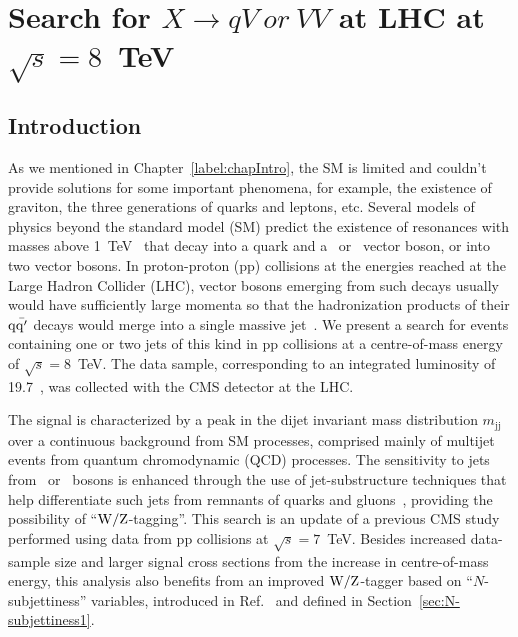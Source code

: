 \chapter{Search for $X \to qV~or~VV$ at LHC at $\sqrt{s}=8$~TeV}
\label{chap:chapter3}
\section{Introduction}
\label{sec:introduction}

As we mentioned in Chapter~\ref{label:chapIntro}, the SM is limited and couldn't
provide solutions for some important phenomena, for example, the existence of 
graviton, the three generations of quarks and leptons, etc. 
Several models of physics beyond the standard model (SM) predict the
existence of resonances with masses above 1~TeV~ that decay into a
quark and a \PW\ or \cPZ\ vector boson, or into two vector bosons. In
proton-proton (pp) collisions at the energies reached at the Large Hadron
Collider (LHC), vector bosons emerging from such decays usually would have
sufficiently large momenta so that the hadronization products of their
${\rm q\bar{q'}}$ decays would merge into a single massive
jet~\cite{Gouzevitch:2013qca}. We present a search for events
containing one or two jets of this kind in pp collisions at a
centre-of-mass energy of $\sqrt{s}=8$~TeV.  The data sample,
corresponding to an integrated luminosity of 19.7~\fbinv, was collected
with the CMS detector at the LHC.

The signal is characterized by a peak in the dijet invariant mass
distribution $m_\mathrm{jj}$ over a continuous background from SM
processes, comprised mainly of multijet events from quantum
chromodynamic (QCD) processes. The sensitivity to jets from \PW\ or
\cPZ\ bosons is enhanced through the use of jet-substructure
techniques that help differentiate such jets from remnants of quarks
and gluons~\cite{topwtag_pas,JME-13-006}, providing the possibility of
``${\rm W}/{\rm Z}$-tagging''. This search is an update of a previous CMS
study~\cite{ref_2011} performed using data from pp collisions at
$\sqrt{s}=7$~TeV. Besides increased data-sample size and larger
signal cross sections from the increase in centre-of-mass energy, this
analysis also benefits from an improved ${\rm W}/{\rm Z}$-tagger based on
``$N$-subjettiness'' variables, introduced in
Ref.~\cite{Thaler:2010tr} and defined in Section~\ref{sec:N-subjettiness1}.


